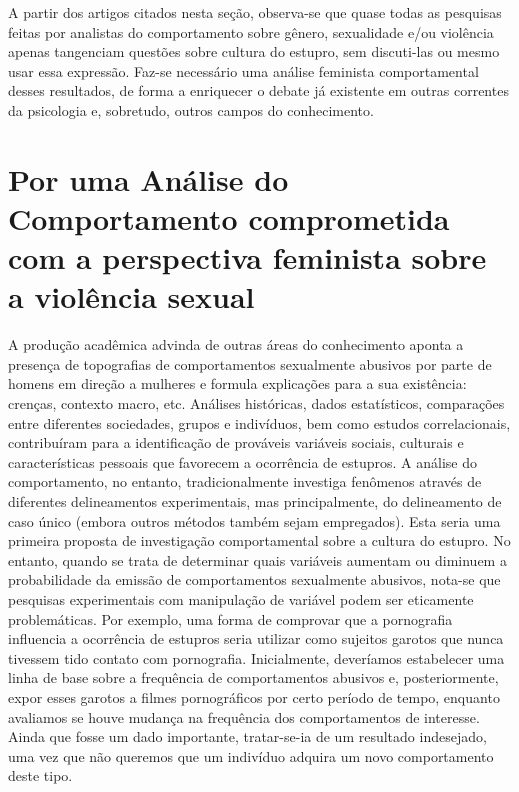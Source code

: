 A partir dos artigos citados nesta seção, observa-se que quase todas as pesquisas feitas por analistas do comportamento sobre gênero, sexualidade e/ou violência apenas tangenciam questões sobre cultura do estupro, sem discuti-las ou mesmo usar essa expressão. Faz-se necessário uma análise feminista comportamental desses resultados, de forma a enriquecer o debate já existente em outras correntes da psicologia e, sobretudo, outros campos do conhecimento.

\section*{Por uma Análise do Comportamento comprometida com a perspectiva feminista sobre a violência sexual}

A produção acadêmica advinda de outras áreas do conhecimento apon\-ta a presença de topografias de comportamentos sexualmente abusivos por parte de homens em direção a mulheres e formula explicações para a sua existência: crenças, contexto macro, etc. Análises históricas, dados estatísticos, comparações entre diferentes sociedades, grupos e indivíduos, bem como estudos correlacionais, contribuíram para a identificação de prováveis variáveis sociais, culturais e características pessoais que favorecem a ocorrência de estupros. A análise do comportamento, no entanto, tradicionalmente investiga fenômenos através de diferentes delineamentos experimentais, mas principalmente, do delineamento de caso único (embora outros métodos também sejam empregados). Esta seria uma primeira proposta de investigação comportamental sobre a cultura do estupro. No entanto, quando se trata de determinar quais variáveis aumentam ou diminuem a probabilidade da emissão de comportamentos sexualmente abusivos, nota-se que pesquisas experimentais com manipulação de variável podem ser eticamente problemáticas. Por exemplo, uma forma de comprovar que a pornografia influencia a ocorrência de estupros seria utilizar como sujeitos garotos que nunca tivessem tido contato com pornografia. Inicialmente, deveríamos estabelecer uma linha de base sobre a frequência de comportamentos abusivos e, posteriormente, expor esses garotos a filmes pornográficos por certo período de tempo, enquanto avaliamos se houve mudança na frequência dos comportamentos de interesse. Ainda que fosse um dado importante, tratar-se-ia de um resultado indesejado, uma vez que não queremos que um indivíduo adquira um novo comportamento deste tipo.

